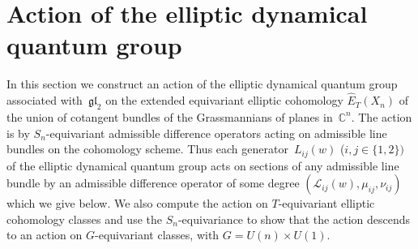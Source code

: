 \documentclass[10pt,a4paper]{amsart}
\numberwithin{equation}{section}
\begin{document}
\section{Action of the elliptic dynamical quantum group}
In this section we construct an action of the elliptic dynamical quantum group associated with~$\mathfrak{gl}_2$ on the extended equivariant elliptic cohomology $\hat E_T(X_n)$ of the union of cotangent bundles of the
Grassmannians of planes in~$\mathbb C^n$. The action is by $S_n$-equivariant admissible difference operators acting on admissible line bundles on the cohomology scheme. Thus each generator~$L_{ij}(w)$ \mbox{($i,j\in\{1,2\})$} of the elliptic dynamical quantum group acts on sections of any admissible line bundle by an admissible difference operator of some degree $(\mathcal L_{ij}(w),\mu_{ij},\nu_{ij})$ which we give below. We also compute the action on $T$-equivariant elliptic cohomology classes and use the $S_n$-equivariance to show that the action descends to an action on $G$-equivariant classes, with $G=U(n)\times U(1)$.
\end{document}
